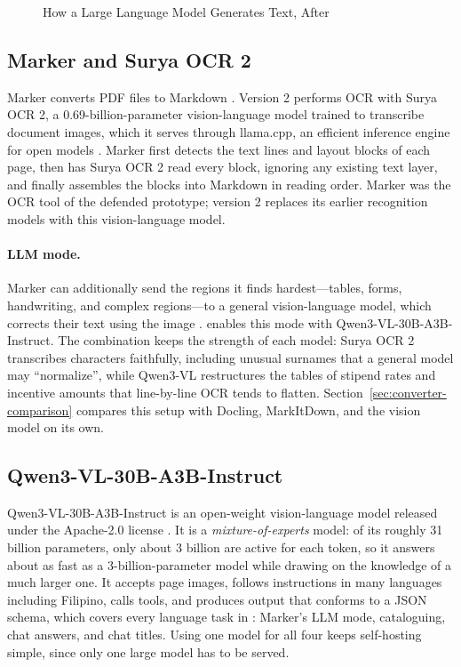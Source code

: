 \begin{figure}[htbp]
  \centering
  
  \caption{How a Large Language Model Generates Text, After \citet{mulugeta2023}}\label{fig:llm-process}
\end{figure}

\subsection{Marker and Surya OCR 2}

Marker converts PDF files to Markdown \citep{marker2025}. Version 2 performs OCR with Surya OCR 2, a 0.69-billion-parameter vision-language model trained to transcribe document images, which it serves through llama.cpp, an efficient inference engine for open models \citep{surya2025,llamacpp2025}. Marker first detects the text lines and layout blocks of each page, then has Surya OCR 2 read every block, ignoring any existing text layer, and finally assembles the blocks into Markdown in reading order. Marker was the OCR tool of the defended prototype; version 2 replaces its earlier recognition models with this vision-language model.

\paragraph{LLM mode.} Marker can additionally send the regions it finds hardest---tables, forms, handwriting, and complex regions---to a general vision-language model, which corrects their text using the image \citep{marker2025}. \cs{} enables this mode with Qwen3-VL-30B-A3B-Instruct. The combination keeps the strength of each model: Surya OCR 2 transcribes characters faithfully, including unusual surnames that a general model may ``normalize'', while Qwen3-VL restructures the tables of stipend rates and incentive amounts that line-by-line OCR tends to flatten. Section~\ref{sec:converter-comparison} compares this setup with Docling, MarkItDown, and the vision model on its own.

\subsection{Qwen3-VL-30B-A3B-Instruct}

Qwen3-VL-30B-A3B-Instruct is an open-weight vision-language model released under the Apache-2.0 license \citep{qwen3vl2025}. It is a \emph{mixture-of-experts} model: of its roughly 31 billion parameters, only about 3 billion are active for each token, so it answers about as fast as a 3-billion-parameter model while drawing on the knowledge of a much larger one. It accepts page images, follows instructions in many languages including Filipino, calls tools, and produces output that conforms to a JSON schema, which covers every language task in \cs{}: Marker's LLM mode, cataloguing, chat answers, and chat titles. Using one model for all four keeps self-hosting simple, since only one large model has to be served.

